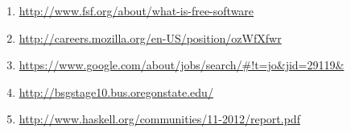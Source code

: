 \documentclass[12pt,letterpaper]{article}
\begin{document}
\begin{enumerate}
  \item \url{http://www.fsf.org/about/what-is-free-software}

  \item \url{http://careers.mozilla.org/en-US/position/ozWfXfwr}

  \item \url{https://www.google.com/about/jobs/search/#!t=jo&jid=29119&}

  \item \url{http://bsgstage10.bus.oregonstate.edu/}

  \item \url{http://www.haskell.org/communities/11-2012/report.pdf}
\end{enumerate}
\end{document}
